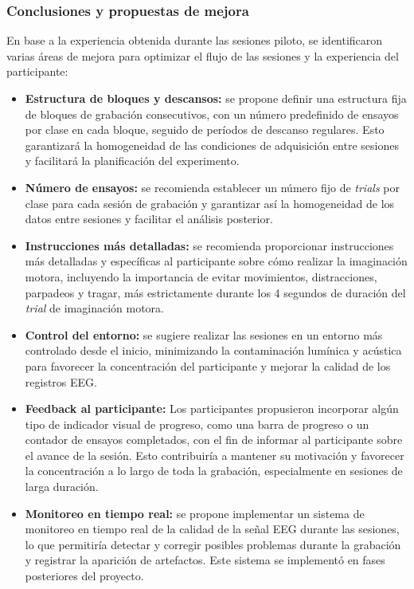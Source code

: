 \subsubsection{Conclusiones y propuestas de mejora}

En base a la experiencia obtenida durante las sesiones piloto, se identificaron varias áreas de mejora para optimizar el flujo de las sesiones y la experiencia del participante:

\begin{itemize}
    \item \textbf{Estructura de bloques y descansos:} se propone definir una estructura fija de bloques de grabación consecutivos, con un número predefinido de ensayos por clase en cada bloque, seguido de períodos de descanso regulares. Esto garantizará la homogeneidad de las condiciones de adquisición entre sesiones y facilitará la planificación del experimento.
    
    \item \textbf{Número de ensayos:} se recomienda establecer un número fijo de \textit{trials} por clase para cada sesión de grabación y garantizar así la homogeneidad de los datos entre sesiones y facilitar el análisis posterior.

    \item \textbf{Instrucciones más detalladas:} se recomienda proporcionar instrucciones más detalladas y específicas al participante sobre cómo realizar la imaginación motora, incluyendo la importancia de evitar movimientos, distracciones, parpadeos y tragar, más estrictamente durante los 4 segundos de duración del \textit{trial} de imaginación motora.
    
    \item \textbf{Control del entorno:} se sugiere realizar las sesiones en un entorno más controlado desde el inicio, minimizando la contaminación lumínica y acústica para favorecer la concentración del participante y mejorar la calidad de los registros EEG.

    \item \textbf{Feedback al participante:} Los participantes propusieron incorporar algún tipo de indicador visual de progreso, como una barra de progreso o un contador de ensayos completados, con el fin de informar al participante sobre el avance de la sesión. Esto contribuiría a mantener su motivación y favorecer la concentración a lo largo de toda la grabación, especialmente en sesiones de larga duración.

    \item \textbf{Monitoreo en tiempo real:} se propone implementar un sistema de monitoreo en tiempo real de la calidad de la señal EEG durante las sesiones, lo que permitiría detectar y corregir posibles problemas durante la grabación y registrar la aparición de artefactos. Este sistema se implementó en fases posteriores del proyecto.

\end{itemize}

